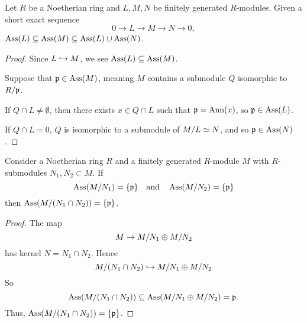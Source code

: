 \documentclass{ximera}
\begin{document}
\begin{proposition}\label{P:subsetassassin}
  Let $R$ be a Noetherian ring and $L,M,N$ be finitely generated
  $R$-modules. Given a short exact sequence
  \[
  0 \to L \to M \to N \to 0,
  \]
  $\operatorname{Ass}(L) \subseteq \operatorname{Ass}(M) \subseteq \operatorname{Ass}(L) \cup \operatorname{Ass}(N)$.
  \begin{proof}
    Since $L\hookrightarrow M$, we see $\operatorname{Ass}(L) \subseteq \operatorname{Ass}(M)$.

    Suppose that $\mathfrak{p}\in\operatorname{Ass}(M)$, meaning $M$ contains a submodule $Q$
    isomorphic to $R/\mathfrak{p}$.

    If $Q\cap L \ne \emptyset$, then there exists $x\in Q\cap L$ such
    that $\mathfrak{p} = \operatorname{Ann}(x)$, so $\mathfrak{p}\in\operatorname{Ass}(L)$.

    If $Q\cap L = 0$, $Q$ is isomorphic to a submodule of $M/L\simeq N$,
    and so $\mathfrak{p}\in\operatorname{Ass}(N)$.
  \end{proof}
\end{proposition}








\begin{lemma}\label{L:intersectassassin}
  Consider a Noetherian ring $R$ and a finitely generated $R$-module
  $M$ with $R$-submodules $N_1,N_2\subset M$. If
  \[
  \operatorname{Ass}(M/N_1) = \{\mathfrak{p}\} \quad\text{and}\quad \operatorname{Ass}(M/N_2) = \{\mathfrak{p}\}
  \]
  then $\operatorname{Ass}(M/(N_1\cap N_2)) = \{\mathfrak{p}\}$.
  \begin{proof}
    The map
    \[
    M \to M/N_1\oplus M/N_2
    \]
    has kernel $N = N_1\cap N_2$. Hence
    \[
    M/(N_1\cap N_2)\hookrightarrow M/N_1\oplus M/N_2
    \]
    So
    \[
    \operatorname{Ass}(M/(N_1\cap N_2)) \subseteq\operatorname{Ass}(M/N_1\oplus M/N_2) = {\mathfrak{p}}. 
    \]
    Thus, $\operatorname{Ass}(M/(N_1\cap N_2))=\{\mathfrak{p}\}$.
  \end{proof}
\end{lemma}
\end{document}
